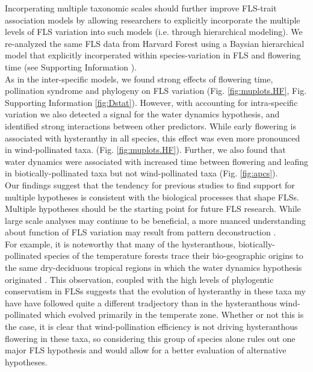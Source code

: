 \documentclass[11pt]{article}
\begin{document}
\noindent Incorperating multiple taxonomic scales should further improve FLS-trait association models by allowing researchers to explicitly incorporate the multiple levels of FLS variation into such models (i.e. through hierarchical modeling). We re-analyzed the same FLS data from Harvard Forest using a Baysian hierarchical model that explicitly incorperated within species-variation in FLS and flowering time (see Supporting Information ).\\

\noindent As in the inter-specific models, we found strong effects of flowering time, pollination syndrome and phylogeny on FLS variation (Fig. \ref{fig:muplots.HF}, Fig. Supporting Information \ref{fig:Dstat}). However, with accounting for intra-specific variation we also detected a signal for the water dynamics hypothesis, and identified strong interactions between other predictors. While early flowering is associated with hysteranthy in all species, this effect was even more pronounced in wind-pollinated taxa. (Fig. \ref{fig:muplots.HF}). Further, we also found that water dynamics were associated with increased time between flowering and leafing in biotically-pollinated taxa but not wind-pollinated taxa (Fig. \ref{fig:apcs}). \\

\noindent Our findings suggest that the tendency for previous studies to find support for multiple hypotheses \citep{Bolmgren2003,Gougherty2018,Savage2019} is consistent with the biological processes that shape FLSs. Multiple hypotheses should be the starting point for future FLS research. While large scale analyses may continue to be beneficial, a more nuanced understanding about function of FLS variation may result from pattern deconstruction \citep[i.e. grouping of species according to trait commonalities or their geographic or phylogenetic distributions,][]{Terribile2009}.\\

\noindent For example, it is noteworthy that many of the hysteranthous, biotically-pollinated species of the temperature forests trace their bio-geographic origins to the same dry-deciduous tropical regions \citep{Daubenmire1972} in which the water dynamics hypothesis originated \citep{Janzen1967,Franklin2016}. This observation, coupled with the high levels of phylogentic conservatism in FLSs suggests that the evolution of hysteranthy in these taxa my have have followed quite a different tradjectory than in the hysteranthous wind-pollinated which evolved primarily in the temperate zone. Whether or not this is the case, it is clear that  wind-pollination efficiency is not driving hysteranthous flowering in these taxa, so considering this group of species alone rules out one major FLS hypothesis and would allow for a better evaluation of alternative hypotheses. 
\end{document}
